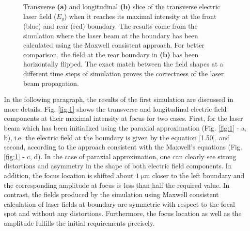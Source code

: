\begin{figure}[h!]
	\centering
	\hspace{1mm}
	\caption{Transverse \textbf{(a)} and longitudinal \textbf{(b)} slice of the transverse electric laser field ($ E_{y} $) when it reaches its maximal intensity at the front (blue) and rear (red) boundary. The results come from the simulation where the laser beam at the boundary has been calculated using the Maxwell consistent approach. For better comparison, the field at the rear boundary in \textbf{(b)} has been horizontally flipped. The exact match between the field shapes at a different time steps of simulation proves the correctness of the laser beam propagation.}
	\label{fig:4}
\end{figure}

In the following paragraph, the results of the first simulation are discussed in more details. Fig. \ref{fig:1} shows the transverse and longitudinal electric field components at their maximal intensity at focus for two cases. First, for the laser beam which has been initialized using the paraxial approximation (Fig. \ref{fig:1} - a, b), i.e. the electric field at the boundary is given by the equation \ref{1.50}, and second, according to the approach consistent with the Maxwell's equations (Fig. \ref{fig:1} - c, d). In the case of paraxial approximation, one can clearly see strong distortions and asymmetry in the shape of both electric field components. In addition, the focus location is shifted about $ 1 \ \mathrm{\mu m} $ closer to the left boundary and the corresponding amplitude at focus is less than half the required value. In contrast, the fields produced by the simulation using Maxwell consistent calculation of laser fields at boundary are symmetric with respect to the focal spot and without any distortions. Furthermore, the focus location as well as the amplitude fulfills the initial requirements precisely.

